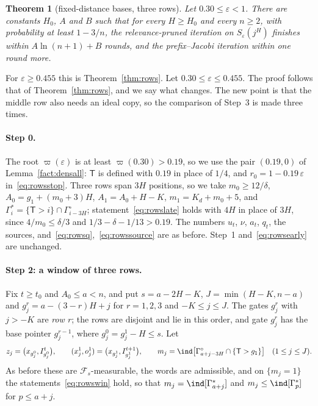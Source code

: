 \documentclass[11pt]{amsart}
\newtheorem{theorem}{Theorem}
\theoremstyle{definition}
\theoremstyle{remark}
\newcommand{\eps}{\varepsilon}
\newcommand{\cF}{\mathcal{F}}
\begin{document}
\begin{theorem}[fixed-distance bases, three rows]\label{thm:rows3}
Let $0.30\le\eps<1$. There are constants $H_0$, $A$ and $B$ such that for every $H\ge H_0$ and
every $n\ge2$, with probability at least $1-3/n$, the relevance-pruned iteration on
$S_\eps(j^H)$ finishes within $A\ln(n+1)+B$ rounds, and the prefix--Jacobi iteration within one
round more.
\end{theorem}

\noindent For $\eps\ge0.455$ this is Theorem~\ref{thm:rows}. Let $0.30\le\eps\le0.455$. The proof
follows that of Theorem~\ref{thm:rows}, and we say what changes. The new point is that the middle
row also needs an ideal copy, so the comparison of Step~3 is made three times.

\paragraph{Step 0.} The root $\varpi(\eps)$ is at least $\varpi(0.30)>0.19$, so we use the pair
$(0.19,0)$ of Lemma~\ref{fact:densall}: $\mathsf T$ is defined with $0.19$ in place of $1/4$, and
$r_0=1-0.19\,\eps$ in~\eqref{eq:rowsstop}. Three rows span $3H$ positions, so we take
$m_0\ge12/\delta$, $A_0=g_1+(m_0+3)H$, $A_1=A_0+H-K$, $m_1=K_d+m_0+5$, and
$\Gamma^*_i=\{\mathsf T>i\}\cap\Gamma^\circ_{i-3H}$; statement~\eqref{eq:rowslate} holds with
$4H$ in place of $3H$, since $4/m_0\le\delta/3$ and $1/3-\delta-1/13>0.19$. The numbers $u_t$,
$\nu$, $a_t$, $q_t$, the sources, and~\eqref{eq:rowsq},~\eqref{eq:rowssource} are as before.
Step~1 and~\eqref{eq:rowsearly} are unchanged.

\paragraph{Step 2: a window of three rows.}
Fix $t\ge t_0$ and $A_0\le a<n$, and put $s=a-2H-K$, $J=\min(H-K,n-a)$ and
$g^r_j=a-(3-r)H+j$ for $r=1,2,3$ and $-K\le j\le J$. The gates $g^r_j$ with $j>-K$ are
\emph{row $r$}; the rows are disjoint and lie in this order, and gate $g^r_j$ has the base
pointer $g^{r-1}_j$, where $g^0_j=g^1_j-H\le s$. Let
\[
z_j=\bigl(x_{g^0_j},I^t_{g^0_j}\bigr),\qquad(x^1_j,o^1_j)=\bigl(x_{g^1_j},I^{t+1}_{g^1_j}\bigr),\qquad
m_j=\ind\bigl[\Gamma^\circ_{a+j-3H}\cap\{\mathsf T>g_1\}\bigr]\quad(1\le j\le J).
\]
As before these are $\cF_s$-measurable, the words are admissible, and on $\{m_j=1\}$ the
statements~\eqref{eq:rowswin} hold, so that $m_j=\ind[\Gamma^*_{a+j}]$ and
$m_j\le\ind[\Gamma^*_p]$ for $p\le a+j$.
\end{document}
